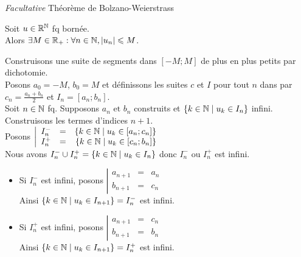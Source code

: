 \documentclass{article}
\renewenvironment{question_kholle}[2][ ]
{
	\subsection{\texorpdfstring{#2}{}}
	\notblank{#1}
	{
		\noindent #1
		\bigbreak
	}
	{}
	\begin{proof}
}
{
	\end{proof}
}
\begin{document}
	\begin{question_kholle}
		{\emph{Facultative} Théorème de Bolzano-Weierstrass}

		Soit $u \in \mathbb R^{\mathbb N}$ fq bornée. \\
		Alors $\exists M \in \mathbb R_+ : \forall n \in \mathbb N, |u_n| \leqslant M$.

		Construisons une suite de segments dans $[-M;M]$ de plus en plus petits par dichotomie. \\
		Posons $a_0 = -M$, $b_0 = M$ et définissons les suites $c$ et $I$ pour tout $n$ dans \N par $c_n = \frac{a_n + b_n}{2}$ et $I_n = [a_n;b_n]$. \\
		
		\noindent Soit $n\in \mathbb N$ fq.
		Supposons $a_n \text{ et } b_n$ construits et $\{ k \in \mathbb N \;|\; u_k \in I_n \}$ infini.
		Construisons les termes d'indices $n+1$. \\
		Posons $\left| \begin{array}{lcr}
			I_n^- &=& \{ k \in \mathbb N \;|\; u_k \in [a_n;c_n] \} \\
			I_n^+ &=& \{ k \in \mathbb N \;|\; u_k \in [c_n;b_n] \} \\
		\end{array} \right.$ \\
		Nous avons $I_n^- \cup I_n^+ = \{ k \in \mathbb N \;|\; u_k \in I_n \}$ donc $I_n^-$ ou $I_n^+$ est infini.

		\begin{itemize}
			\item Si $I_n^-$ est infini, posons $\left| \begin{array}{lcl}
				a_{n+1} &=& a_n \\
				b_{n+1} &=& c_n
			\end{array} \right.$ \\
			Ainsi $\{ k \in \mathbb N \;|\; u_k \in I_{n+1} \} = I_n^-$ est infini.
			\item Si $I_n^+$ est infini, posons $\left| \begin{array}{lcl}
				a_{n+1} &=& c_n \\
				b_{n+1} &=& b_n
			\end{array} \right.$ \\
			Ainsi $\{ k \in \mathbb N \;|\; u_k \in I_{n+1} \} = I_n^+$ est infini.
		\end{itemize}
		\bigbreak


\end{question_kholle}
\end{document}
